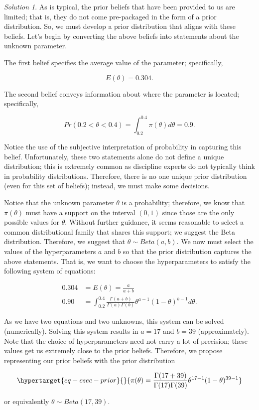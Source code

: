\documentclass[
  letterpaper,
  DIV=11,
  numbers=noendperiod]{scrreprt}
\theoremstyle{definition}
\theoremstyle{plain}
\theoremstyle{definition}
\theoremstyle{remark}
\newtheorem*{solution}{Solution}
\begin{document}
\begin{solution}

As is typical, the prior beliefs that have been provided to us are
limited; that is, they do not come pre-packaged in the form of a prior
distribution. So, we must develop a prior distribution that aligns with
these beliefs. Let's begin by converting the above beliefs into
statements about the unknown parameter.

The first belief specifies the average value of the parameter;
specifically,

\[E(\theta) = 0.304.\]

The second belief conveys information about where the parameter is
located; specifically,

\[Pr(0.2 < \theta < 0.4) = \int_{0.2}^{0.4} \pi(\theta) d\theta = 0.9.\]

Notice the use of the subjective interpretation of probability in
capturing this belief. Unfortunately, these two statements alone do not
define a unique distribution; this is extremely common as discipline
experts do not typically think in probability distributions. Therefore,
there is no one unique prior distribution (even for this set of
beliefs); instead, we must make some decisions.

Notice that the unknown parameter \(\theta\) is a probability;
therefore, we know that \(\pi(\theta)\) must have a support on the
interval \((0, 1)\) since those are the only possible values for
\(\theta\). Without further guidance, it seems reasonable to select a
common distributional family that shares this support; we suggest the
Beta distribution. Therefore, we suggest that
\(\theta \sim Beta(a, b)\). We now must select the values of the
hyperparameters \(a\) and \(b\) so that the prior distribution captures
the above statements. That is, we want to choose the hyperparameters to
satisfy the following system of equations:

\[
\begin{aligned}
  0.304 &= E(\theta) = \frac{a}{a+b} \\
  0.90 &= \int_{0.2}^{0.4} \frac{\Gamma(a + b)}{\Gamma(a)\Gamma(b)} \theta^{a-1} (1 - \theta)^{b-1} d\theta.
\end{aligned}
\]

As we have two equations and two unknowns, this system can be solved
(numerically). Solving this system results in \(a = 17\) and \(b = 39\)
(approximately). Note that the choice of hyperparameters need not carry
a lot of precision; these values get us extremely close to the prior
beliefs. Therefore, we propose representing our prior beliefs with the
prior distribution

\begin{equation}\protect\hypertarget{eq-csec-prior}{}{\pi(\theta) = \frac{\Gamma(17 + 39)}{\Gamma(17)\Gamma(39)} \theta^{17-1} (1 - \theta)^{39-1}}\label{eq-csec-prior}\end{equation}

or equivalently \(\theta \sim Beta(17, 39)\).

\end{solution}
\end{document}
